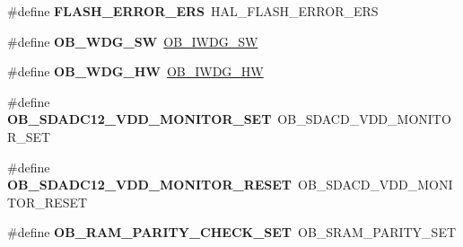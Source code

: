 \begin{DoxyCompactItemize}
\item 
\hypertarget{group___h_a_l___f_l_a_s_h___aliased___defines_gaf908de74b3e013ed30976d9e645354e2}{\#define {\bfseries F\-L\-A\-S\-H\-\_\-\-E\-R\-R\-O\-R\-\_\-\-E\-R\-S}~H\-A\-L\-\_\-\-F\-L\-A\-S\-H\-\_\-\-E\-R\-R\-O\-R\-\_\-\-E\-R\-S}\label{group___h_a_l___f_l_a_s_h___aliased___defines_gaf908de74b3e013ed30976d9e645354e2}

\item 
\hypertarget{group___h_a_l___f_l_a_s_h___aliased___defines_gac332a5aa5da146e19f3c39067220f0f8}{\#define {\bfseries O\-B\-\_\-\-W\-D\-G\-\_\-\-S\-W}~\hyperlink{group___f_l_a_s_h_ex___option___bytes___i_watchdog_ga5a357e232c955444c3f2ccb9a937ffce}{O\-B\-\_\-\-I\-W\-D\-G\-\_\-\-S\-W}}\label{group___h_a_l___f_l_a_s_h___aliased___defines_gac332a5aa5da146e19f3c39067220f0f8}

\item 
\hypertarget{group___h_a_l___f_l_a_s_h___aliased___defines_gae9a94b5f21aaa5dd5558095fa684b5a3}{\#define {\bfseries O\-B\-\_\-\-W\-D\-G\-\_\-\-H\-W}~\hyperlink{group___f_l_a_s_h_ex___option___bytes___i_watchdog_gadfcbfa963d79c339ec8e2d5a7734e47a}{O\-B\-\_\-\-I\-W\-D\-G\-\_\-\-H\-W}}\label{group___h_a_l___f_l_a_s_h___aliased___defines_gae9a94b5f21aaa5dd5558095fa684b5a3}

\item 
\hypertarget{group___h_a_l___f_l_a_s_h___aliased___defines_ga28d03f0c0e87570a3bc2faa4e720b8e3}{\#define {\bfseries O\-B\-\_\-\-S\-D\-A\-D\-C12\-\_\-\-V\-D\-D\-\_\-\-M\-O\-N\-I\-T\-O\-R\-\_\-\-S\-E\-T}~O\-B\-\_\-\-S\-D\-A\-C\-D\-\_\-\-V\-D\-D\-\_\-\-M\-O\-N\-I\-T\-O\-R\-\_\-\-S\-E\-T}\label{group___h_a_l___f_l_a_s_h___aliased___defines_ga28d03f0c0e87570a3bc2faa4e720b8e3}

\item 
\hypertarget{group___h_a_l___f_l_a_s_h___aliased___defines_ga330d35b134c5a576318103b718559b11}{\#define {\bfseries O\-B\-\_\-\-S\-D\-A\-D\-C12\-\_\-\-V\-D\-D\-\_\-\-M\-O\-N\-I\-T\-O\-R\-\_\-\-R\-E\-S\-E\-T}~O\-B\-\_\-\-S\-D\-A\-C\-D\-\_\-\-V\-D\-D\-\_\-\-M\-O\-N\-I\-T\-O\-R\-\_\-\-R\-E\-S\-E\-T}\label{group___h_a_l___f_l_a_s_h___aliased___defines_ga330d35b134c5a576318103b718559b11}

\item 
\hypertarget{group___h_a_l___f_l_a_s_h___aliased___defines_ga98952cd374b07146bb79583fd61ef6e6}{\#define {\bfseries O\-B\-\_\-\-R\-A\-M\-\_\-\-P\-A\-R\-I\-T\-Y\-\_\-\-C\-H\-E\-C\-K\-\_\-\-S\-E\-T}~O\-B\-\_\-\-S\-R\-A\-M\-\_\-\-P\-A\-R\-I\-T\-Y\-\_\-\-S\-E\-T}\label{group___h_a_l___f_l_a_s_h___aliased___defines_ga98952cd374b07146bb79583fd61ef6e6}


\end{DoxyCompactItemize}
